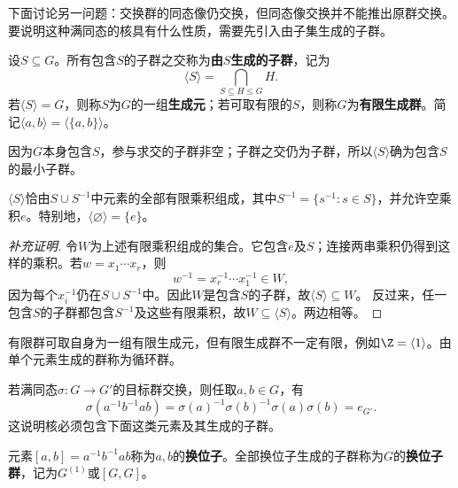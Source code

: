 下面讨论另一问题：交换群的同态像仍交换，但同态像交换并不能推出原群交换。要说明这种满同态的核具有什么性质，需要先引入由子集生成的子群。

\begin{definition}
\label{p2:concept:c2-l142}设$S\subseteq G$。所有包含$S$的子群之交称为\textbf{由$S$生成的子群}，记为
\[
\langle S\rangle=\bigcap_{S\subseteq H\leq G}H.
\]
\label{p2:concept:c2-l146}若$\langle S\rangle=G$，则称$S$为$G$的一组\textbf{生成元}；若可取有限的$S$，则称$G$为\textbf{有限生成群}。简记$\langle a,b\rangle=\langle\{a,b\}\rangle$。
\end{definition}

因为$G$本身包含$S$，参与求交的子群非空；子群之交仍为子群，所以$\langle S\rangle$确为包含$S$的最小子群。

\begin{proposition}
$\langle S\rangle$恰由$S\cup S^{-1}$中元素的全部有限乘积组成，其中$S^{-1}=\{s^{-1}:s\in S\}$，并允许空乘积$e$。特别地，$\langle\varnothing\rangle=\{e\}$。
\end{proposition}
\begin{proof}[补充证明]
令$W$为上述有限乘积组成的集合。它包含$e$及$S$；连接两串乘积仍得到这样的乘积。若$w=x_1\cdots x_r$，则
\[
w^{-1}=x_r^{-1}\cdots x_1^{-1}\in W,
\]
因为每个$x_i^{-1}$仍在$S\cup S^{-1}$中。因此$W$是包含$S$的子群，故$\langle S\rangle\subseteq W$。
反过来，任一包含$S$的子群都包含$S^{-1}$及这些有限乘积，故$W\subseteq\langle S\rangle$。两边相等。
\end{proof}

有限群可取自身为一组有限生成元，但有限生成群不一定有限，例如$\Z=\langle1\rangle$。由单个元素生成的群称为循环群。

若满同态$\sigma:G\to G'$的目标群交换，则任取$a,b\in G$，有
\[
\sigma(a^{-1}b^{-1}ab)
=\sigma(a)^{-1}\sigma(b)^{-1}\sigma(a)\sigma(b)=e_{G'}.
\]
这说明核必须包含下面这类元素及其生成的子群。

\begin{definition}
\label{p2:concept:c2-l173}元素$[a,b]=a^{-1}b^{-1}ab$称为$a,b$的\textbf{换位子}。全部换位子生成的子群称为$G$的\textbf{换位子群}，记为$G^{(1)}$或$[G,G]$。
\end{definition}

